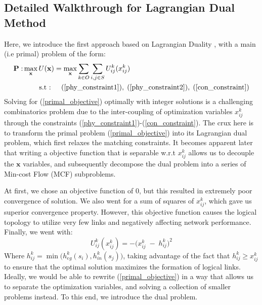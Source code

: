 \documentclass[sigconf]{acmart}
\theoremstyle{definition}
\begin{document}
\begin{appendices}
\subsection{Detailed Walkthrough for Lagrangian Dual Method}
Here, we introduce the first approach based on Lagrangian Duality \cite{low1999optimization}, with a main (i.e primal) problem of the form:
\begin{equation}
\begin{aligned}
    \mathbf{P: } \max_{\mathbf{x}} U(\mathbf{x}) &= \max_{\mathbf{x}} \sum_{k \in O}\sum_{i, j \in S}U_{ij}^k(x^k_{ij})\\
     \text{s.t : } & \quad (\ref{phy_constraint1}), \; (\ref{phy_constraint2}), \; (\ref{con_constraint})\\
\end{aligned}
\label{primal_objective}
\end{equation}
Solving for (\ref{primal_objective}) optimally with integer solutions is a challenging combinatorics problem due to the inter-coupling of optimization variables $x_{ij}^k$ through the constraints (\ref{phy_constraint1})-(\ref{con_constraint}). The crux here is to transform the primal problem (\ref{primal_objective}) into its Lagrangian dual problem, which first relaxes the matching constraints. It becomes apparent later that writing a objective function that is separable w.r.t $x_{ij}^k$ allows us to decouple the $\mathbf{x}$ variables, and subsequently decompose the dual problem into a series of Min-cost Flow (MCF) subproblems.

At first, we chose an objective function of 0, but this resulted in extremely poor convergence of solution. We also went for a sum of squares of $x_{ij}^k$, which gave us superior convergence property. However, this objective function causes the logical topology to utilize very few links and negatively affecting network performance. Finally, we went with:
\begin{equation}\label{primalU}
U_{ij}^k(x_{ij}^k) = - \Big(x_{ij}^k \; - \; h_{ij}^k \Big)^2
\end{equation}
Where $h_{ij}^k = \min\big(h_{eg}^k(s_i), h_{in}^k(s_j)\big)$, taking advantage of the fact that $h_{ij}^k \geq x_{ij}^k$ to ensure that the optimal solution maximizes the formation of logical links. Ideally, we would be able to rewrite (\ref{primal_objective}) in a way that allows us to separate the optimization variables, and solving a collection of smaller problems instead. To this end, we introduce the dual problem. 


\end{appendices}
\end{document}
